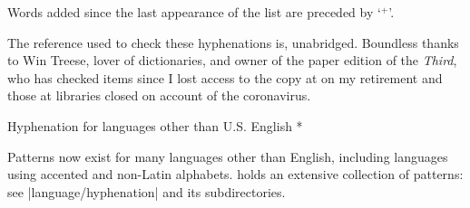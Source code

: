 Words added since the last appearance of the list are preceded by `${}^+$'.

The reference used to check these hyphenations is, unabridged.  Boundless thanks to
Win Treese, lover of dictionaries, and owner of the paper edition of
the {\sl Third}, who has checked items since I lost access to the copy
at  on my retirement and those at libraries closed on account of
the coronavirus.

%
%


%

\head * Hyphenation for languages \break other than U.S. English *

Patterns now exist for many languages other than  English,
including languages using accented and non-Latin alphabets.
{\CTAN} holds an extensive collection of patterns: see
|language/hyphenation| and its subdirectories.

